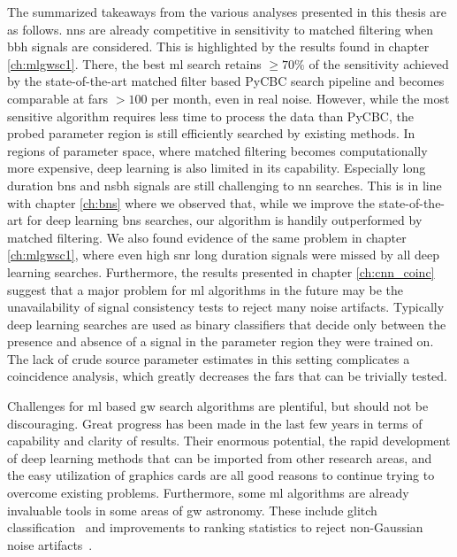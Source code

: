 The summarized takeaways from the various analyses presented in this thesis are as follows. \acrshort{nn}s are already competitive in sensitivity to matched filtering when \acrshort{bbh} signals are considered. This is highlighted by the results found in chapter \ref{ch:mlgwsc1}. There, the best \acrshort{ml} search retains $\geq 70\%$ of the sensitivity achieved by the state-of-the-art matched filter based PyCBC search pipeline and becomes comparable at \acrshort{far}s $> 100$ per month, even in real noise. However, while the most sensitive algorithm requires less time to process the data than PyCBC, the probed parameter region is still efficiently searched by existing methods. In regions of parameter space, where matched filtering becomes computationally more expensive, deep learning is also limited in its capability. Especially long duration \acrshort{bns} and \acrshort{nsbh} signals are still challenging to \acrshort{nn} searches. This is in line with chapter \ref{ch:bns} where we observed that, while we improve the state-of-the-art for deep learning \acrshort{bns} searches, our algorithm is handily outperformed by matched filtering. We also found evidence of the same problem in chapter \ref{ch:mlgwsc1}, where even high \acrshort{snr} long duration signals were missed by all deep learning searches. Furthermore, the results presented in chapter \ref{ch:cnn_coinc} suggest that a major problem for \acrshort{ml} algorithms in the future may be the unavailability of signal consistency tests to reject many noise artifacts. Typically deep learning searches are used as binary classifiers that decide only between the presence and absence of a signal in the parameter region they were trained on. The lack of crude source parameter estimates in this setting complicates a coincidence analysis, which greatly decreases the \acrshort{far}s that can be trivially tested.

Challenges for \acrshort{ml} based \acrshort{gw} search algorithms are plentiful, but should not be discouraging. Great progress has been made in the last few years in terms of capability and clarity of results. Their enormous potential, the rapid development of deep learning methods that can be imported from other research areas, and the easy utilization of graphics cards are all good reasons to continue trying to overcome existing problems. Furthermore, some \acrshort{ml} algorithms are already invaluable tools in some areas of \acrshort{gw} astronomy. These include glitch classification~\cite{Zevin:2016qwy} and improvements to ranking statistics to reject non-Gaussian noise artifacts~\cite{Mishra:2021tmu}.

